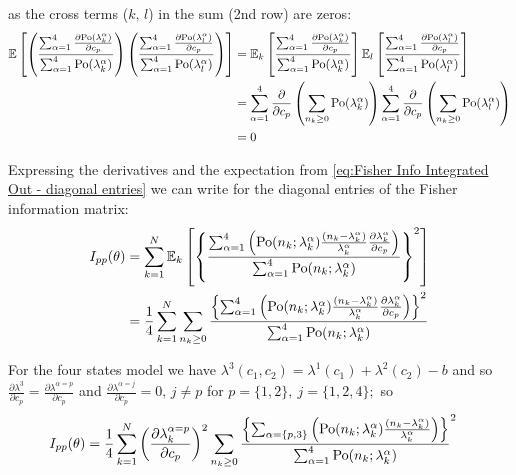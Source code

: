 %
as the cross terms ($k,\, l$) in the sum (2nd row) are zeros: 
%
\begin{alignat*}{1}
	\mathbb{E}\left[\left(\frac{\sum_{\alpha=1}^4\frac{\partial\mathrm{Po}(\lambda_k^\alpha)}{\partial c_p}}{\sum_{\alpha=1}^4\mathrm{Po}(\lambda_k^\alpha)}\right)\left(\frac{\sum_{\alpha=1}^4\frac{\partial\mathrm{Po}(\lambda_l^\alpha)}{\partial c_p}}{\sum_{\alpha=1}^4\mathrm{Po}(\lambda_l^\alpha)}\right)\right] 
	& =\mathbb{E}_k\left[\frac{\sum_{\alpha=1}^4\frac{\partial\mathrm{Po}(\lambda_k^\alpha)}{\partial c_p}}{\sum_{\alpha=1}^4\mathrm{Po}(\lambda_k^\alpha)}\right]\mathbb{E}_l\left[\frac{\sum_{\alpha=1}^4\frac{\partial\mathrm{Po}(\lambda_l^\alpha)}{\partial c_p}}{\sum_{\alpha=1}^4\mathrm{Po}(\lambda_l^\alpha)}\right]\\
 	& =\sum_{\alpha=1}^4\frac{\partial}{\partial c_p}\left(\sum_{n_k\geq0}\mathrm{Po}(\lambda_k^\alpha)\right)\sum_{\alpha=1}^4\frac{\partial}{\partial c_p}\left(\sum_{n_k\geq0}\mathrm{Po}(\lambda_l^\alpha)\right)\\
 	& =0
\end{alignat*}

Expressing the derivatives and the expectation from \autoref{eq:Fisher Info Integrated Out - diagonal entries} we can write for the diagonal entries of the Fisher information matrix:
%
\begin{alignat*}{1}
	I_{pp}(\theta) & =\sum_{k=1}^N\mathbb{E}_k\left[\left\{ \frac{\sum_{\alpha=1}^4\left(\mathrm{Po}(n_k;\lambda_k^\alpha)\frac{(n_k-\lambda_k^\alpha)}{\lambda_k^\alpha}\frac{\partial\lambda_k^\alpha}{\partial c_p}\right)}{\sum_{\alpha=1}^4\mathrm{Po}(n_k;\lambda_k^\alpha)}\right\} ^2\right]\\
 	& =\frac{1}{4}\sum_{k=1}^N\sum_{n_k\geq0}\frac{\left\{ \sum_{\alpha=1}^4\left(\mathrm{Po}(n_k;\lambda_k^\alpha)\frac{(n_k-\lambda_k^\alpha)}{\lambda_k^\alpha}\frac{\partial\lambda_k^\alpha}{\partial c_p}\right)\right\} ^2}{\sum_{\alpha=1}^4\mathrm{Po}(n_k;\lambda_k^\alpha)}
\end{alignat*}

For the four states model we have $\lambda^3(c_1,c_2)=\lambda^1(c_1)+\lambda^2(c_2)-b$ and so $\frac{\partial\lambda^3}{\partial c_p}=\frac{\partial\lambda^{\alpha=p}}{\partial c_p}$ and $\frac{\partial\lambda^{\alpha=j}}{\partial c_p}=0,\, j\neq p$ for $p=\{1,2\},\: j=\{1,2,4\};$ so 
%
\begin{alignat*}{1}
	I_{pp}(\theta) & =\frac{1}{4}\sum_{k=1}^N\left(\frac{\partial\lambda_k^{\alpha=p}}{\partial c_p}\right)^2\sum_{n_k\geq0}\frac{\left\{\sum_{\alpha=\{p,3\}}\left(\mathrm{Po}(n_k;\lambda_k^\alpha)\frac{(n_k-\lambda_k^\alpha)}{\lambda_k^\alpha}\right)\right\}}{\sum_{\alpha=1}^4\mathrm{Po}(n_k;\lambda_k^\alpha)} ^2
\end{alignat*}


